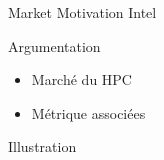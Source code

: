 %
\begin{Frame}{Market Motivation Intel}
      \begin{block}{Argumentation}
        \begin{itemize}
        \item Marché du HPC
        \item Métrique associées
        \end{itemize}
      \end{block} 
      \begin{block}{Illustration}
      \end{block}   
\end{Frame}


